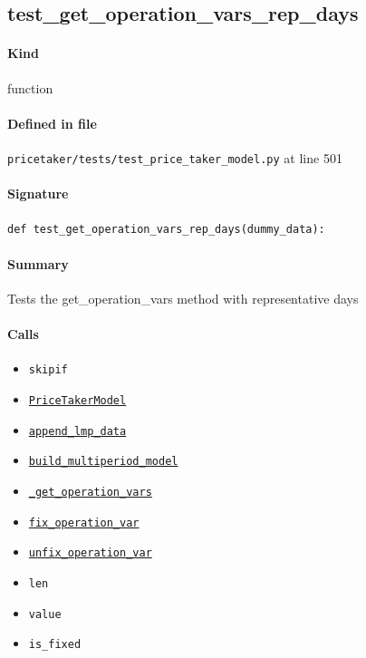 \documentclass[11pt]{report}
\begin{document}
\subsection{test\_get\_operation\_vars\_rep\_days}
\label{def:pricetaker-tests-test_price_taker_model.py:test_get_operation_vars_rep_days:L501}
\paragraph{Kind} function
\paragraph{Defined in file} \texttt{pricetaker/tests/test\_price\_taker\_model.py} at line 501
\paragraph{Signature} \texttt{def test\_get\_operation\_vars\_rep\_days(dummy\_data):}
\paragraph{Summary} Tests the get\_operation\_vars method with representative days
\paragraph{Calls}
\begin{itemize}[leftmargin=*]
  \item \texttt{skipif}
  \item \hyperref[def:pricetaker-price_taker_model.py:PriceTakerModel:L161]{\texttt{PriceTakerModel}}
  \item \hyperref[def:pricetaker-price_taker_model.py:PriceTakerModel.append_lmp_data:L221]{\texttt{append\_lmp\_data}}
  \item \hyperref[def:pricetaker-price_taker_model.py:PriceTakerModel.build_multiperiod_model:L291]{\texttt{build\_multiperiod\_model}}
  \item \hyperref[def:pricetaker-price_taker_model.py:PriceTakerModel._get_operation_vars:L482]{\texttt{\_get\_operation\_vars}}
  \item \hyperref[def:pricetaker-price_taker_model.py:PriceTakerModel.fix_operation_var:L504]{\texttt{fix\_operation\_var}}
  \item \hyperref[def:pricetaker-price_taker_model.py:PriceTakerModel.unfix_operation_var:L518]{\texttt{unfix\_operation\_var}}
  \item \texttt{len}
  \item \texttt{value}
  \item \texttt{is\_fixed}
\end{itemize}
\end{document}
